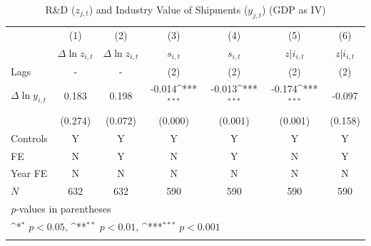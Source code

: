 \documentclass{_latex/house}
\begin{document}
\begin{table}[h!t]\footnotesize
\caption{R\&D ($z_{j,t}$) and Industry Value of Shipments ($y_{j,t}$) (GDP as IV)}
\begin{center}
{
\def\sym#1{\ifmmode^{#1}\else\(^{#1}\)\fi}
\begin{tabular}{l*{6}{c}}
\hline\hline
            &\multicolumn{1}{c}{(1)}&\multicolumn{1}{c}{(2)}&\multicolumn{1}{c}{(3)}&\multicolumn{1}{c}{(4)}&\multicolumn{1}{c}{(5)}&\multicolumn{1}{c}{(6)}\\
            &\multicolumn{1}{c}{$\Delta \ln{z_{i,t}}$}&\multicolumn{1}{c}{$\Delta \ln{z_{i,t}}$}&\multicolumn{1}{c}{$s_{i,t}$}&\multicolumn{1}{c}{$s_{i,t}$}&\multicolumn{1}{c}{$z|i_{i,t}$}&\multicolumn{1}{c}{$z|i_{i,t}$}\\
\hline
Lags & - & - & (2) & (2) & (2) & (2) \\
[1em]
$\Delta \ln{y_{i,t}}$ & 0.183 & 0.198 & -0.014\sym{***}& -0.013\sym{***}& -0.174\sym{***}& -0.097 \\
 & (0.274) & (0.072) & (0.000) & (0.001) & (0.001) & (0.158) \\
[1em]
Controls & Y & Y & Y & Y & Y & Y \\
[1em]
FE & N & Y & N & Y & N & Y \\
[1em]
Year FE & N & N & N & N & N & N \\
\hline
\(N\) & 632 & 632 & 590 & 590 & 590 & 590 \\
\hline\hline
\multicolumn{7}{l}{\footnotesize \textit{p}-values in parentheses}\\
\multicolumn{7}{l}{\footnotesize \sym{*} \(p<0.05\), \sym{**} \(p<0.01\), \sym{***} \(p<0.001\)}\\
\label{tab:table7}
\end{tabular}
}
\end{center}
\end{table}
\end{document}
